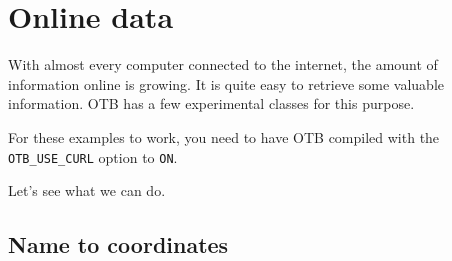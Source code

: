 \chapter{Online data}\label{sec:Online}

With almost every computer connected to the internet, the amount
of information online is growing. It is quite easy to retrieve some
valuable information. OTB has a few experimental classes for this purpose.

For these examples to work, you need to have OTB compiled with the
\texttt{OTB_USE_CURL} option to \texttt{ON}.

Let's see what we can do.

\section{Name to coordinates}
\label{sec:NamesToCoordinates}
